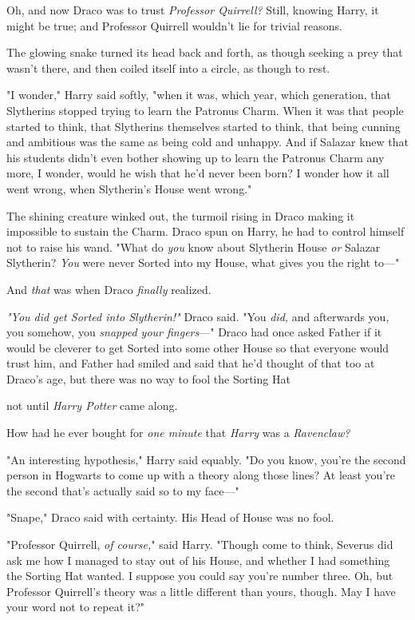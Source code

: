 Oh, and now Draco was to trust \emph{Professor Quirrell?} Still, knowing Harry,
it might be true; and Professor Quirrell wouldn't lie for trivial reasons.

The glowing snake turned its head back and forth, as though seeking a prey that
wasn't there, and then coiled itself into a circle, as though to rest.

"I wonder," Harry said softly, "when it was, which year, which generation, that
Slytherins stopped trying to learn the Patronus Charm. When it was that people
started to think, that Slytherins themselves started to think, that being
cunning and ambitious was the same as being cold and unhappy. And if Salazar
knew that his students didn't even bother showing up to learn the Patronus
Charm any more, I wonder, would he wish that he'd never been born? I wonder how
it all went wrong, when Slytherin's House went wrong."

The shining creature winked out, the turmoil rising in Draco making it
impossible to sustain the Charm. Draco spun on Harry, he had to control himself
not to raise his wand. "What do \emph{you} know about Slytherin House \emph{or}
Salazar Slytherin? \emph{You} were never Sorted into my House, what gives you
the right to\mbox{---}"

And \emph{that} was when Draco \emph{finally} realized.

\emph{"You did get Sorted into Slytherin!"} Draco said. "You \emph{did,} and
afterwards you, you somehow, you \emph{snapped your fingers}\mbox{---}" Draco had once
asked Father if it would be cleverer to get Sorted into some other House so
that everyone would trust him, and Father had smiled and said that he'd thought
of that too at Draco's age, but there was no way to fool the Sorting Hat{\el}

{\el} not until \emph{Harry Potter} came along.

How had he ever bought for \emph{one minute} that \emph{Harry} was a
\emph{Ravenclaw?}

"An interesting hypothesis," Harry said equably. "Do you know, you're the
second person in Hogwarts to come up with a theory along those lines? At least
you're the second that's actually said so to my face\mbox{---}"

"Snape," Draco said with certainty. His Head of House was no fool.

"Professor Quirrell, \emph{of course,}" said Harry. "Though come to think,
Severus did ask me how I managed to stay out of his House, and whether I had
something the Sorting Hat wanted. I suppose you could say you're number three.
Oh, but Professor Quirrell's theory was a little different than yours, though.
May I have your word not to repeat it?"


